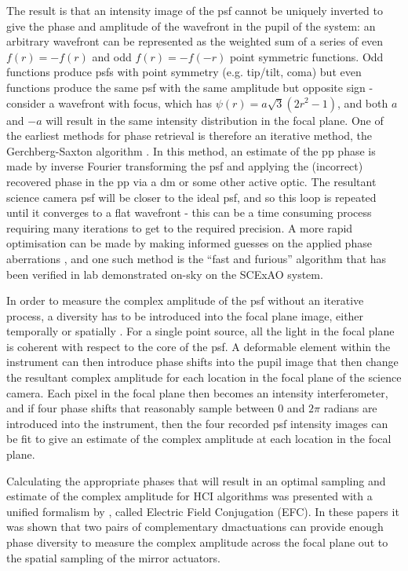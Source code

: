 \documentclass[letterpaper]{ar-1col}
\begin{document}
The result is that an intensity image of the \ac{psf} cannot be uniquely inverted to give the phase and amplitude of the wavefront in the pupil of the system: an arbitrary wavefront can be represented as the weighted sum of a series of even $f(r)=-f(r)$ and odd $f(r)=-f(-r)$ point symmetric functions.
%
Odd functions produce \acp{psf} with point symmetry (e.g. tip/tilt, coma) but even functions produce the same \ac{psf} with the same amplitude but opposite sign - consider a wavefront with focus, which has $\psi(r) = a\sqrt{3}(2r^2-1)$, and both $a$ and $-a$ will result in the same intensity distribution in the focal plane.
%
One of the earliest methods for phase retrieval is therefore an iterative method, the Gerchberg-Saxton algorithm \citep{Gerchberg72}.
%
In this method, an estimate of the \ac{pp} phase is made by inverse Fourier transforming the \ac{psf} and applying the (incorrect) recovered phase in the \ac{pp} via a \ac{dm} or some other active optic.
%
The resultant science camera \ac{psf} will be closer to the ideal \ac{psf}, and so this loop is repeated until it converges to a flat wavefront - this can be a time consuming process requiring many iterations to get to the required precision.
%
A more rapid optimisation can be made by making informed guesses on the applied phase aberrations \citep{Gonsalves02}, and one such method is the ``fast and furious'' algorithm \citep{Keller12} that has been verified in lab \citep{Wilby18} demonstrated on-sky \citep{Bos20} on the SCExAO system. 

In order to measure the complex amplitude of the \ac{psf} without an iterative process, a diversity has to be introduced into the focal plane image, either temporally or spatially \citep[see ][ for a review of these]{Fienup13,Gonsalves14}.
%
For a single point source, all the light in the focal plane is coherent with respect to the core of the \ac{psf}.
%
A deformable element within the instrument can then introduce phase shifts into the pupil image that then change the resultant complex amplitude for each location in the focal plane of the science camera.
%
Each pixel in the focal plane then becomes an intensity interferometer, and if four phase shifts that reasonably sample between $0$ and $2\pi$ radians are introduced into the instrument, then the four recorded \ac{psf} intensity images can be fit to give an estimate of the complex amplitude at each location in the focal plane.

Calculating the appropriate phases that will result in an optimal sampling and estimate of the complex amplitude for HCI algorithms was presented with a unified formalism by \citet{Giveon09,Giveon10}, called Electric Field Conjugation (EFC).
%
In these papers it was shown that two pairs of complementary \ac{dm}actuations can provide enough phase diversity to measure the complex amplitude across the focal plane out to the spatial sampling of the mirror actuators.
\end{document}
